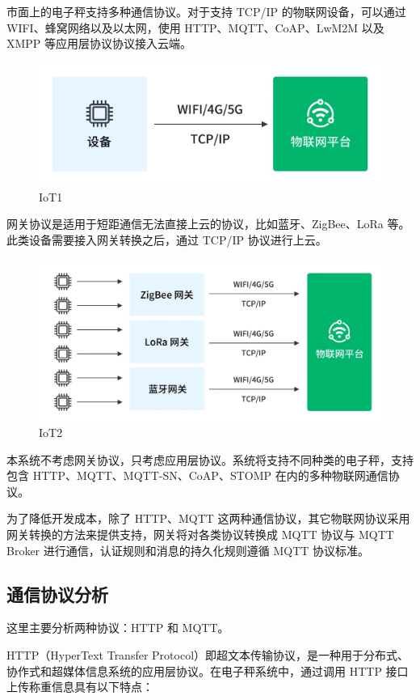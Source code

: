 市面上的电子秤支持多种通信协议。对于支持 TCP/IP 的物联网设备，可以通过 WIFI、蜂窝网络以及以太网，使用 HTTP、MQTT、CoAP、LwM2M 以及 XMPP 等应用层协议协议接入云端。

\begin{figure}[H]
    \centering
    \includegraphics[width=0.8\linewidth]{../design/IoT1.png}
    \caption{IoT1}
    \label{fig:IoT1}
\end{figure}

网关协议是适用于短距通信无法直接上云的协议，比如蓝牙、ZigBee、LoRa 等。此类设备需要接入网关转换之后，通过 TCP/IP 协议进行上云。

\begin{figure}[H]
    \centering
    \includegraphics[width=0.8\linewidth]{../design/IoT2.png}
    \caption{IoT2}
    \label{fig:IoT2}
\end{figure}

本系统不考虑网关协议，只考虑应用层协议。系统将支持不同种类的电子秤，支持包含 HTTP、MQTT、MQTT-SN、CoAP、STOMP 在内的多种物联网通信协议。

为了降低开发成本，除了 HTTP、MQTT 这两种通信协议，其它物联网协议采用网关转换的方法来提供支持，网关将对各类协议转换成 MQTT 协议与 MQTT Broker 进行通信，认证规则和消息的持久化规则遵循 MQTT 协议标准。

\subsection{通信协议分析}

这里主要分析两种协议：HTTP 和 MQTT。

HTTP（HyperText Transfer Protocol）即超文本传输协议，是一种用于分布式、协作式和超媒体信息系统的应用层协议。在电子秤系统中，通过调用 HTTP 接口上传称重信息具有以下特点：

